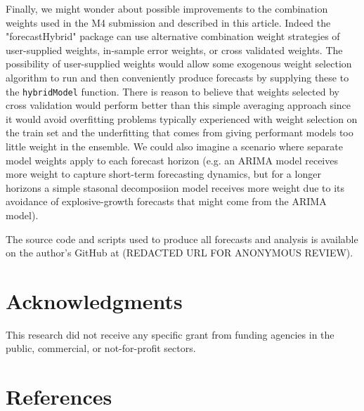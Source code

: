 \documentclass[11pt,3p,review,authoryear]{elsarticle}
\begin{document}
Finally, we might wonder about possible improvements to the combination weights used in the M4 submission and described in this article. Indeed the "forecastHybrid" package can use alternative combination weight strategies of user-supplied weights, in-sample error weights, or cross validated weights. The possibility of user-supplied weights would allow some exogenous weight selection algorithm to run and then conveniently produce forecasts by supplying these to the \texttt{hybridModel} function. There is reason to believe that weights selected by cross validation would perform better than this simple averaging approach since it would avoid overfitting problems typically experienced with weight selection on the train set and the underfitting that comes from giving performant models too little weight in the ensemble. We could also imagine a scenario where separate model weights apply to each forecast horizon (e.g. an ARIMA model receives more weight to capture short-term forecasting dynamics, but for a longer horizons a simple stasonal decomposiion model receives more weight due to its avoidance of explosive-growth forecasts that might come from the ARIMA model).

The source code and scripts used to produce all forecasts and analysis is available on the author's GitHub at (REDACTED URL FOR ANONYMOUS REVIEW).

\section*{Acknowledgments}

This research did not receive any specific grant from funding agencies in the public, commercial, or not-for-profit sectors.


\section{References}

\end{document}
